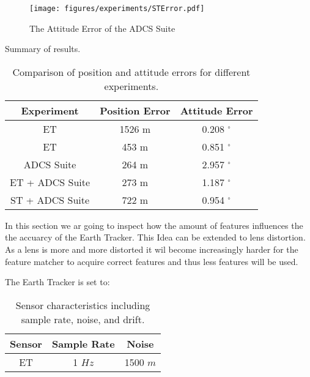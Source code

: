 \begin{figure}[H]
    \centering
    \texttt{[image: figures/experiments/STError.pdf]}
    \caption{The Attitude Error of the ADCS Suite}
    \label{fig:STError}
\end{figure}

Summary of results.

\begin{table}[H]
\centering
\begin{tabular}{|c|c|c|}
\hline
\textbf{Experiment} & \textbf{Position Error} & \textbf{Attitude Error} \\ \hline
ET & 1526 m & 0.208 $^{\circ}$  \\ \hline
ET & 453 m  & 0.851 $^{\circ}$ \\ \hline
ADCS Suite & 264 m & 2.957 $^{\circ}$ \\ \hline
ET + ADCS Suite & 273 m &  1.187 $^{\circ}$\\ \hline
ST + ADCS Suite & 722 m &  0.954 $^{\circ}$ \\ \hline
\end{tabular}
\caption{Comparison of position and attitude errors for different experiments.}
\label{tab:experiment_errors}
\end{table}

\label{sec:FeatureTest}

In this section we ar going to inspect how the amount of features influences the the accuarcy of the Earth Tracker.
This Idea can be extended to lens distortion. As a lens is more and more distorted it wil become increasingly harder for the feature matcher to acquire correct features and thus less features will be used.

The Earth Tracker is set to:

\begin{table}[H]
\centering
\begin{tabular}{|c|c|c|}
\hline
\textbf{Sensor} & \textbf{Sample Rate} & \textbf{Noise} \\ \hline
ET  &  1 $Hz$ & 1500 $m$ \\ \hline
\end{tabular}
\caption{Sensor characteristics including sample rate, noise, and drift.}
\label{tab:ET_characteristics2}
\end{table}


